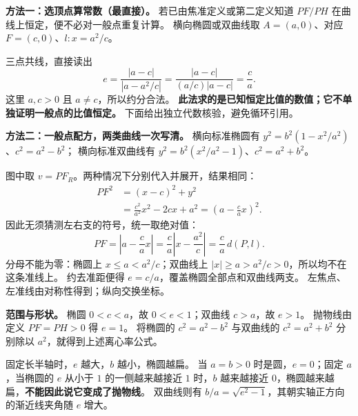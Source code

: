 \begin{proofbox}
\textbf{方法一：选顶点算常数（最直接）。}
若已由焦准定义或第二定义知道 $PF/PH$ 在曲线上恒定，便不必对一般点重复计算。
横向椭圆或双曲线取 $A=(a,0)$、对应 $F=(c,0)$、$l:x=a^2/c$。

三点共线，直接读出
\[
 e=\frac{|a-c|}{|a-a^2/c|}
 =\frac{|a-c|}{(a/c)|a-c|}=\boxed{\frac ca}.
\]
这里 $a,c>0$ 且 $a\ne c$，所以约分合法。
\textbf{此法求的是已知恒定比值的数值；它不单独证明一般点的比值恒定。}
下面给出独立代数核验，避免循环引用。
\end{proofbox}
\clearpage
\begin{proofbox}
\textbf{方法二：一般点配方，两类曲线一次写清。}
横向标准椭圆有 $y^2=b^2(1-x^2/a^2)$、$c^2=a^2-b^2$；
横向标准双曲线有 $y^2=b^2(x^2/a^2-1)$、$c^2=a^2+b^2$。

图中取 $v=PF_R$。两种情况下分别代入并展开，结果相同：
\[
 \begin{aligned}
 PF^2&=(x-c)^2+y^2\\
 &=\frac{c^2}{a^2}x^2-2cx+a^2
 =\left(a-\frac ca x\right)^2.
 \end{aligned}
\]
因此无须猜测左右支的符号，统一取绝对值：
\[
 PF=\left|a-\frac ca x\right|
 =\frac ca\left|x-\frac{a^2}{c}\right|
 =\frac ca\,d(P,l).
\]
分母不能为零：椭圆上 $x\le a<a^2/c$；双曲线上 $|x|\ge a>a^2/c>0$，所以均不在这条准线上。
约去准距便得 $e=c/a$，覆盖椭圆全部点和双曲线两支。
左焦点、左准线由对称性得到；纵向交换坐标。

\medskip
\textbf{范围与形状。} 椭圆 $0<c<a$，故 $0<e<1$；双曲线 $c>a$，故 $e>1$。
抛物线由定义 $PF=PH>0$ 得 $e=1$。
将椭圆的 $c^2=a^2-b^2$ 与双曲线的 $c^2=a^2+b^2$ 分别除以 $a^2$，就得到上述离心率公式。

固定长半轴时，$e$ 越大，$b$ 越小，椭圆越扁。
当 $a=b>0$ 时是圆，$e=0$；固定 $a$，当椭圆的 $e$ 从小于 $1$ 的一侧越来越接近 $1$ 时，$b$ 越来越接近 $0$，椭圆越来越扁，\textbf{不能因此说它变成了抛物线}。
双曲线则有 $b/a=\sqrt{e^2-1}$，其朝实轴正方向的渐近线夹角随 $e$ 增大。
\end{proofbox}
\clearpage


